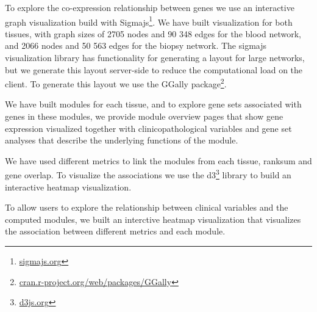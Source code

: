 To explore the co-expression relationship between genes we use an interactive
graph visualization build with Sigmajs\footnote{\url{sigmajs.org}}. We have
built visualization for both tissues, with graph sizes of 2705 nodes and 90 348
edges for the blood network, and 2066 nodes and 50 563 edges for the biopsy
network. The sigmajs visualization library has functionality for generating a
layout for large networks, but we generate this layout server-side to reduce the
computational load on the client. To generate this layout we use the GGally
package\footnote{\url{cran.r-project.org/web/packages/GGally}}. 

We have built modules for each tissue, and to explore gene sets associated with
genes in these modules, we provide module overview pages that show gene
expression visualized together with clinicopathological variables and gene set
analyses that describe the underlying functions of the module. 

We have used different metrics to link the modules from each tissue, ranksum and
gene overlap. To visualize the associations we use the
d3\footnote{\url{d3js.org}} library to build an interactive heatmap
visualization. 

To allow users to explore the relationship between clinical variables and the
computed modules, we built an interctive heatmap visualization that visualizes
the association between different metrics and each module. 




